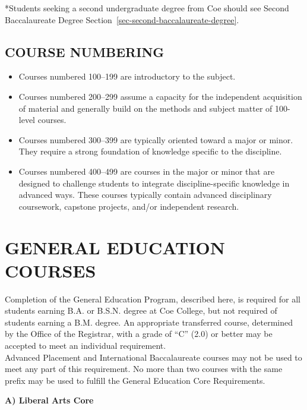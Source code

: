 \documentclass[
  letterpaper,
]{scrbook}
\providecommand{\tightlist}{%
  \setlength{\itemsep}{0pt}\setlength{\parskip}{0pt}}
\begin{document}
*Students seeking a second undergraduate degree from Coe should see
Second Baccalaureate Degree
Section~\ref{sec-second-baccalaureate-degree}.

\section{COURSE NUMBERING}\label{course-numbering}

\begin{itemize}
\tightlist
\item
  Courses numbered 100--199 are introductory to the subject.
\item
  Courses numbered 200--299 assume a capacity for the independent
  acquisition of material and generally build on the methods and subject
  matter of 100-level courses.
\item
  Courses numbered 300--399 are typically oriented toward a major or
  minor. They require a strong foundation of knowledge specific to the
  discipline.
\item
  Courses numbered 400--499 are courses in the major or minor that are
  designed to challenge students to integrate discipline-specific
  knowledge in advanced ways. These courses typically contain advanced
  disciplinary coursework, capstone projects, and/or independent
  research.
\end{itemize}

\chapter{GENERAL EDUCATION COURSES}\label{sec-general-education-courses}

Completion of the General Education Program, described here, is required
for all students earning B.A. or B.S.N. degree at Coe College, but not
required of students earning a B.M. degree. An appropriate transferred
course, determined by the Office of the Registrar, with a grade of ``C''
(2.0) or better may be accepted to meet an individual requirement.\\
Advanced Placement and International Baccalaureate courses may not be
used to meet any part of this requirement. No more than two courses with
the same prefix may be used to fulfill the General Education Core
Requirements.

\textbf{A) Liberal Arts Core}
\end{document}
